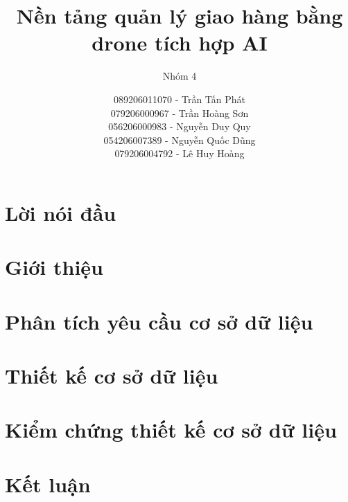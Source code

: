 \documentclass[a4paper,11pt,openany]{book}
\begin{document}
\title{Nền tảng quản lý giao hàng bằng drone tích hợp AI}


\subtitle{Nhóm 4}

\author{089206011070 - Trần Tấn Phát\\
        079206000967 - Trần Hoàng Sơn\\
        056206000983 - Nguyễn Duy Quy\\
        054206007389 - Nguyễn Quốc Dũng\\
        079206004792 - Lê Huy Hoàng}
\maketitle

\begingroup
\small
\setlength{\cftbeforechapskip}{2pt}
\setlength{\cftbeforesecskip}{0pt}
\tableofcontents
\endgroup

\chapter{Lời nói đầu}


\chapter{Giới thiệu}\label{c:introduction}


\chapter{Phân tích yêu cầu cơ sở dữ liệu}\label{c:analysis}


\chapter{Thiết kế cơ sở dữ liệu}\label{c:design}


\chapter{Kiểm chứng thiết kế cơ sở dữ liệu}\label{c:test}


\chapter{Kết luận} \label{c:conclusion}

\end{document}
